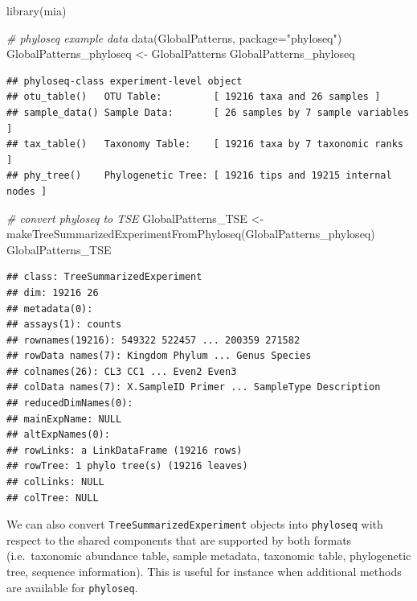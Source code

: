 \documentclass[
]{book}
\newenvironment{Shaded}{\begin{snugshade}}{\end{snugshade}}
\newcommand{\AttributeTok}[1]{\textcolor[rgb]{0.77,0.63,0.00}{#1}}
\newcommand{\CommentTok}[1]{\textcolor[rgb]{0.56,0.35,0.01}{\textit{#1}}}
\newcommand{\FunctionTok}[1]{\textcolor[rgb]{0.00,0.00,0.00}{#1}}
\newcommand{\NormalTok}[1]{#1}
\newcommand{\OtherTok}[1]{\textcolor[rgb]{0.56,0.35,0.01}{#1}}
\newcommand{\StringTok}[1]{\textcolor[rgb]{0.31,0.60,0.02}{#1}}
\begin{document}
\begin{Shaded}
\begin{Highlighting}[]
\FunctionTok{library}\NormalTok{(mia)}

\CommentTok{\# phyloseq example data}
\FunctionTok{data}\NormalTok{(GlobalPatterns, }\AttributeTok{package=}\StringTok{"phyloseq"}\NormalTok{) }
\NormalTok{GlobalPatterns\_phyloseq }\OtherTok{\textless{}{-}}\NormalTok{ GlobalPatterns}
\NormalTok{GlobalPatterns\_phyloseq}
\end{Highlighting}
\end{Shaded}

\begin{verbatim}
## phyloseq-class experiment-level object
## otu_table()   OTU Table:         [ 19216 taxa and 26 samples ]
## sample_data() Sample Data:       [ 26 samples by 7 sample variables ]
## tax_table()   Taxonomy Table:    [ 19216 taxa by 7 taxonomic ranks ]
## phy_tree()    Phylogenetic Tree: [ 19216 tips and 19215 internal nodes ]
\end{verbatim}

\begin{Shaded}
\begin{Highlighting}[]
\CommentTok{\# convert phyloseq to TSE}
\NormalTok{GlobalPatterns\_TSE }\OtherTok{\textless{}{-}} \FunctionTok{makeTreeSummarizedExperimentFromPhyloseq}\NormalTok{(GlobalPatterns\_phyloseq) }
\NormalTok{GlobalPatterns\_TSE}
\end{Highlighting}
\end{Shaded}

\begin{verbatim}
## class: TreeSummarizedExperiment 
## dim: 19216 26 
## metadata(0):
## assays(1): counts
## rownames(19216): 549322 522457 ... 200359 271582
## rowData names(7): Kingdom Phylum ... Genus Species
## colnames(26): CL3 CC1 ... Even2 Even3
## colData names(7): X.SampleID Primer ... SampleType Description
## reducedDimNames(0):
## mainExpName: NULL
## altExpNames(0):
## rowLinks: a LinkDataFrame (19216 rows)
## rowTree: 1 phylo tree(s) (19216 leaves)
## colLinks: NULL
## colTree: NULL
\end{verbatim}

We can also convert \texttt{TreeSummarizedExperiment} objects into \texttt{phyloseq}
with respect to the shared components that are supported by both
formats (i.e.~taxonomic abundance table, sample metadata, taxonomic
table, phylogenetic tree, sequence information). This is useful for
instance when additional methods are available for \texttt{phyloseq}.
\end{document}
